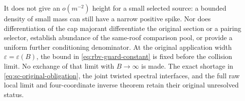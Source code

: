 It does not give an $o(m^{-2})$ height for a small selected source:
a bounded density of small mass can still have a narrow positive
spike.  Nor does differentiation of the cap majorant differentiate
the original section or a pairing selector, establish abundance of
the same-roof comparison pool, or provide a uniform further
conditioning denominator.  At the original application width
$\varepsilon=\varepsilon(B)$, the bound in
\eqref{eq:rbv-guard-constant} is fixed before the collision limit.
No exchange of that limit with $B\to\infty$ is made.  The exact
shortage in \eqref{eq:sc-original-obligation}, the joint twisted
spectral interfaces, and the full raw local limit and four-coordinate
inverse theorem retain their original unresolved status.
